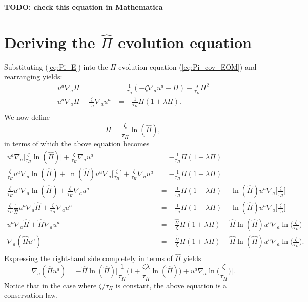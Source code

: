 \documentclass[12pt]{article}
\numberwithin{equation}{section}
\begin{document}
\textbf{TODO: check this equation in Mathematica}

\section{Deriving the $\hat{\Pi}$ evolution equation} \label{sec:Pi_hat_deriv}

Substituting (\ref{eq:Pi_E}) into the $\Pi$ evolution equation (\ref{eq:Pi_cov_EOM}) and rearranging yields:
\begin{equation}
\begin{aligned}
u^a \nabla_a \Pi &= \frac{1}{\tau_{\Pi}} (- \zeta \nabla_a u^a - \Pi) - \frac{\lambda}{\tau_{\Pi}} \Pi^2 \\
u^a \nabla_a \Pi + \frac{\zeta}{\tau_{\Pi}} \nabla_a u^a &= - \frac{1}{\tau_{\Pi}} \Pi ( 1 + \lambda \Pi ). \\
\end{aligned}
\end{equation}
We now define
\begin{equation} \label{eq:Pi_hat_defn}
\Pi = \frac{\zeta}{\tau_\Pi} \ln(\hat{\Pi}),
\end{equation}
in terms of which the above equation becomes
\begin{equation}
\begin{aligned}
u^a \nabla_a \Big[ \frac{\zeta}{\tau_\Pi} \ln(\hat{\Pi}) \Big] + \frac{\zeta}{\tau_{\Pi}} \nabla_a u^a &= - \frac{1}{\tau_{\Pi}} \Pi ( 1 + \lambda \Pi ) \\
\frac{\zeta}{\tau_\Pi} u^a \nabla_a \ln(\hat{\Pi}) + \ln(\hat{\Pi}) u^a \nabla_a \Big[ \frac{\zeta}{\tau_\Pi} \Big] + \frac{\zeta}{\tau_{\Pi}} \nabla_a u^a &= - \frac{1}{\tau_{\Pi}} \Pi ( 1 + \lambda \Pi ) \\
\frac{\zeta}{\tau_\Pi} u^a \nabla_a \ln(\hat{\Pi}) + \frac{\zeta}{\tau_{\Pi}} \nabla_a u^a &= - \frac{1}{\tau_{\Pi}} \Pi ( 1 + \lambda \Pi ) - \ln(\hat{\Pi}) u^a \nabla_a \Big[ \frac{\zeta}{\tau_\Pi} \Big] \\
\frac{\zeta}{\tau_\Pi} \frac{1}{\hat{\Pi}} u^a \nabla_a \hat{\Pi} + \frac{\zeta}{\tau_{\Pi}} \nabla_a u^a &= - \frac{1}{\tau_{\Pi}} \Pi ( 1 + \lambda \Pi ) - \ln(\hat{\Pi}) u^a \nabla_a \Big[ \frac{\zeta}{\tau_\Pi} \Big]\\
u^a \nabla_a \hat{\Pi} + \hat{\Pi} \nabla_a u^a &= - \frac{\hat{\Pi}}{\zeta} \Pi ( 1 + \lambda \Pi ) -  \hat{\Pi} \ln(\hat{\Pi}) u^a \nabla_a \ln \Big( \frac{\zeta}{\tau_\Pi} \Big) \\
\nabla_a (\hat{\Pi} u^a) &= - \frac{\hat{\Pi}}{\zeta} \Pi ( 1 + \lambda \Pi ) -  \hat{\Pi} \ln(\hat{\Pi}) u^a \nabla_a \ln \Big( \frac{\zeta}{\tau_\Pi} \Big). \\
\end{aligned}
\end{equation}
Expressing the right-hand side completely in terms of $\hat{\Pi}$ yields
\begin{equation} \label{eq:Pi_hat_eqn}
\nabla_a (\hat{\Pi} u^a) = - \hat{\Pi} \ln(\hat{\Pi}) \Big[ \frac{1}{\tau_\Pi} \Big( 1 + \frac{\zeta \lambda}{\tau_\Pi} \ln(\hat{\Pi}) \Big) + u^a \nabla_a \ln \Big( \frac{\zeta}{\tau_\Pi} \Big) \Big].
\end{equation}
Notice that in the case where $\zeta/\tau_\Pi$ is constant, the above equation is a conservation law.
\end{document}
